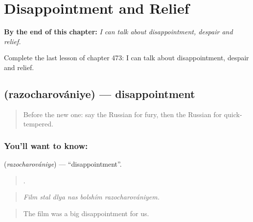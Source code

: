 
\chapter{Disappointment and Relief}
\label{ch:ru-disappointment-and-relief}

\begin{chapteropening}
\textbf{By the end of this chapter:} \emph{I can talk about disappointment, despair and relief.}

Complete the last lesson of chapter 473: I can talk about disappointment, despair and relief.
\end{chapteropening}

\section[\texorpdfstring{\ru{разочарование} (razocharovániye)}{разочарование (razocharovániye)}]{ (razocharovániye) — disappointment}

\label{lesson:RU-C473-razocharovaniye}



\begin{quote}
Before the new one: say the Russian for fury, then the Russian for quick-tempered.
\end{quote}

\subsection*{You'll want to know: }
\textbf{} (\emph{razocharovániye}) — \textquotedblleft{}disappointment\textquotedblright{}.

\begin{quote}
     .
\end{quote}

\begin{quote}
\emph{Film stal dlya nas bolshím razocharovániyem.}
\end{quote}

\begin{quote}
The film was a big disappointment for us.
\end{quote}

